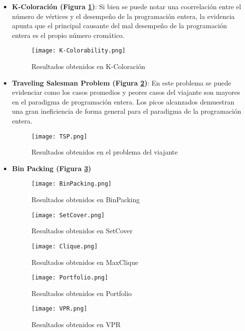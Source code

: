 \documentclass[12pt]{report}
\begin{document}
\begin{itemize}
    \item \textbf{K-Coloración (Figura \ref{fig:K-Colorability})}: Si bien se puede notar una coorrelación entre el número de vértices y el desempeño de la programación entera, la evidencia apunta que el principal causante del mal desempeño de la programación entera es el propio número cromático.
    
    \begin{figure}[ht]
    \centering
    \texttt{[image: K-Colorability.png]}
    \caption{Resultados obtenidos en K-Coloración}
    \label{fig:K-Colorability}
    \end{figure}

    
    \item \textbf{Traveling Salesman Problem (Figura \ref{fig:TSP})}: En este problema se puede evidenciar como los casos promedios y peores casos del viajante son mayores en el paradigma de programación entera. Los picos alcanzados demuestran una gran ineficiencia de forma general para el paradigma de la programación entera.

    \begin{figure}[ht]
    \centering
    \texttt{[image: TSP.png]}
    \caption{Resultados obtenidos en el problema del viajante}
    \label{fig:TSP}
    \end{figure}

    \item \textbf{Bin Packing (Figura \ref{fig:BinPacking})}


    \begin{figure}[ht]
    \centering
    \texttt{[image: BinPacking.png]}
    \caption{Resultados obtenidos en BinPacking}
    \label{fig:BinPacking}
    \end{figure}

    \begin{figure}[ht]
    \centering
    \texttt{[image: SetCover.png]}
    \caption{Resultados obtenidos en SetCover}
    \label{fig:SetCover}
    \end{figure}

    \begin{figure}[ht]
    \centering
    \texttt{[image: Clique.png]}
    \caption{Resultados obtenidos en MaxClique}
    \label{fig:Clique}
    \end{figure}

    \begin{figure}[ht]
    \centering
    \texttt{[image: Portfolio.png]}
    \caption{Resultados obtenidos en Portfolio}
    \label{fig:Portfolio}
    \end{figure}

    \begin{figure}[ht]
    \centering
    \texttt{[image: VPR.png]}
    \caption{Resultados obtenidos en VPR}
    \label{fig:VPR}
    \end{figure}

\end{itemize}
\end{document}
